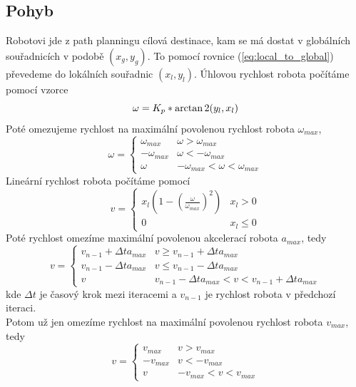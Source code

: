 \documentclass[a4paper,12pt]{article}
\begin{document}
\subsection{Pohyb}
Robotovi jde z path planningu cílová destinace, kam se má dostat v globálních souřadnicích v podobě $(x_g,y_g)$. To pomocí rovnice (\ref{eq:local_to_global}) převedeme do lokálních souřadnic $(x_l,y_l)$. 
Úhlovou rychlost robota počítáme pomocí vzorce 
\begin{equation}
    \omega = K_p * \arctan2(y_l,x_l)\\
    \label{eq:angular_velocity}
\end{equation}
Poté omezujeme rychlost na maximální povolenou rychlost robota $\omega_{max}$,
\begin{equation}
    \omega = \begin{cases}
        \omega_{max} & \omega > \omega_{max} \\
        -\omega_{max} & \omega < -\omega_{max} \\
        \omega & -\omega_{max} < \omega < \omega_{max}
    \end{cases}
\end{equation}
Lineární rychlost robota počítáme pomocí 
\begin{equation}
    v = \begin{cases}
        x_l (1 - (\frac{\omega}{\omega_{max}})^2) & x_l > 0 \\
        0 & x_l \leq 0
    \end{cases}
    \label{eq:linear_velocity}
\end{equation}
Poté rychlost omezíme maximální povolenou akcelerací robota $a_{max}$, tedy
\begin{equation}
    v = \begin{cases}
        v_{n-1} + \Delta t a_{max} & v \geq v_{n-1} + \Delta t a_{max} \\
        v_{n-1} - \Delta t a_{max} & v \leq v_{n-1} - \Delta t a_{max} \\
        v & v_{n-1} - \Delta t a_{max} < v < v_{n-1} + \Delta t a_{max}
    \end{cases}
\end{equation}
kde $\Delta t$ je časový krok mezi iteracemi a $v_{n-1}$ je rychlost robota v předchozí iteraci.\\
Potom už jen omezíme rychlost na maximální povolenou rychlost robota $v_{max}$, tedy
\begin{equation}
    v = \begin{cases}
        v_{max} & v > v_{max} \\
        -v_{max} & v < -v_{max} \\
        v & -v_{max} < v < v_{max}
    \end{cases}
\end{equation}
\end{document}
